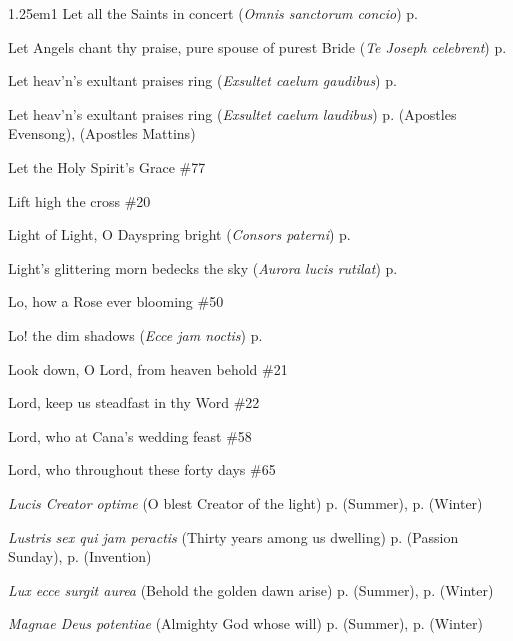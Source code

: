 \begin{hangparas}{1.25em}{1}
Let all the Saints in concert (\textit{Omnis sanctorum concio}) \dotfill p. \pageref{AnneIIEvensong}
\par\noindent
Let Angels chant thy praise, pure spouse of purest Bride (\textit{Te Joseph celebrent}) \dotfill p. \pageref{PatronageEvensong}
\par\noindent
Let heav'n's exultant praises ring (\textit{Exsultet caelum gaudibus}) \dotfill p. \pageref{JohnMattins}
\par\noindent
Let heav'n's exultant praises ring (\textit{Exsultet caelum laudibus}) \dotfill p. \pageref{ApostlesEvensong} (Apostles Evensong), \pageref{ApostlesMattins} (Apostles Mattins)
\par\noindent
Let the Holy Spirit's Grace \dotfill \#77
\par\noindent
Lift high the cross \dotfill \#20
\par\noindent
Light of Light, O Dayspring bright (\textit{Consors paterni}) \dotfill p. \pageref{TuesdayInvitatory}
\par\noindent
Light's glittering morn bedecks the sky (\textit{Aurora lucis rutilat}) \dotfill p. \pageref{EasterDayMattins}
\par\noindent
Lo, how a Rose ever blooming \dotfill \#50
\par\noindent
Lo! the dim shadows (\textit{Ecce jam noctis}) \dotfill p. \pageref{SundayMattinsSummer}
\par\noindent
Look down, O Lord, from heaven behold \dotfill \#21
\par\noindent
Lord, keep us steadfast in thy Word \dotfill \#22
\par\noindent
Lord, who at Cana's wedding feast \dotfill \#58
\par\noindent
Lord, who throughout these forty days \dotfill \#65
\par\noindent
\textit{Lucis Creator optime} (O blest Creator of the light) \dotfill p. \pageref{SundayEvensongSummer} (Summer), p. \pageref{SundayEvensongWinter} (Winter)
\par\noindent
\textit{Lustris sex qui jam peractis} (Thirty years among us dwelling) \dotfill p. \pageref{PassionMattinsHymn} (Passion Sunday), p. \pageref{InventionMattins} (Invention)
\par\noindent
\textit{Lux ecce surgit aurea} (Behold the golden dawn arise) \dotfill p. \pageref{ThursdayMattinsSummer} (Summer), p. \pageref{ThursdayMattinsWinter} (Winter)
\par\noindent
\textit{Magnae Deus potentiae} (Almighty God whose will) \dotfill p. \pageref{ThursdayEvensongSummer} (Summer), p. \pageref{ThursdayEvensongWinter} (Winter)

\end{hangparas}
